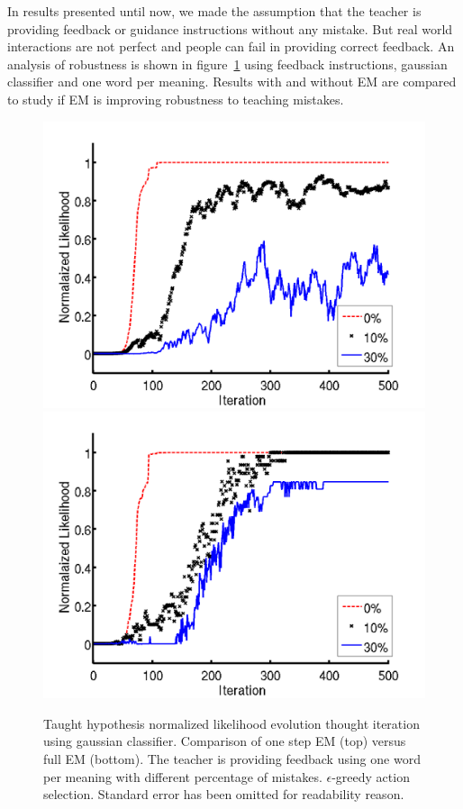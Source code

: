 In results presented until now, we made the assumption that the teacher is providing feedback or guidance instructions without any mistake. But real world interactions are not perfect and people can fail in providing correct feedback. An analysis of robustness is shown in figure~\ref{fig:Noise} using feedback instructions, gaussian classifier and one word per meaning. Results with and without EM are compared to study if EM is improving robustness to teaching mistakes.
%
\begin{figure}[!htbp]
	\centering
		\includegraphics[width=\ww\columnwidth]{images/results/noise_no_EM}
		\includegraphics[width=\ww\columnwidth]{images/results/noise_with_EM}
	\caption{Taught hypothesis normalized likelihood evolution thought iteration using gaussian classifier. Comparison of one step EM (top) versus full EM (bottom). The teacher is providing feedback using one word per meaning with different percentage of mistakes. $\epsilon$-greedy action selection. Standard error has been omitted for readability reason. }
	\label{fig:Noise}
\end{figure}

